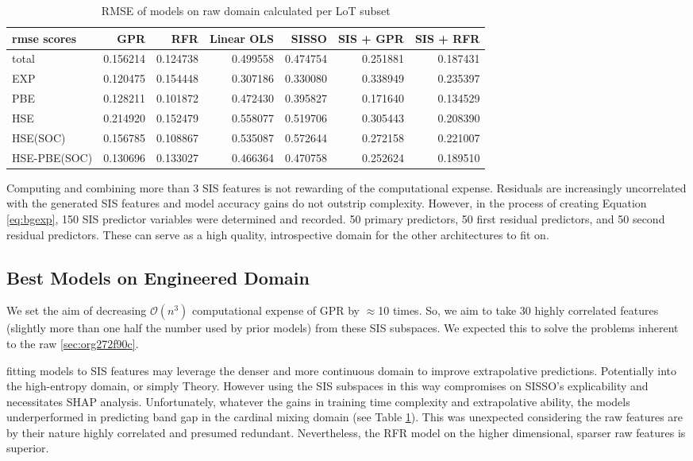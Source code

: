 \begin{table}[htbp]
\caption{\label{tbl:LoTscores} RMSE of models on raw domain calculated per LoT subset}
\centering
\begin{tabular}{lrrrrrr}
rmse scores & GPR & RFR & Linear OLS & SISSO & SIS + GPR & SIS + RFR\\[0pt]
\hline
total & 0.156214 & 0.124738 & 0.499558 & 0.474754 & 0.251881 & 0.187431\\[0pt]
EXP & 0.120475 & 0.154448 & 0.307186 & 0.330080 & 0.338949 & 0.235397\\[0pt]
PBE & 0.128211 & 0.101872 & 0.472430 & 0.395827 & 0.171640 & 0.134529\\[0pt]
HSE & 0.214920 & 0.152479 & 0.558077 & 0.519706 & 0.305443 & 0.208390\\[0pt]
HSE(SOC) & 0.156785 & 0.108867 & 0.535087 & 0.572644 & 0.272158 & 0.221007\\[0pt]
HSE-PBE(SOC) & 0.130696 & 0.133027 & 0.466364 & 0.470758 & 0.252624 & 0.189510\\[0pt]
\end{tabular}
\end{table}

Computing and combining more than 3 SIS features is not rewarding of the computational expense.
Residuals are increasingly uncorrelated with the generated SIS features and model accuracy gains do not outstrip complexity.
However, in the process of creating Equation \ref{eq:bgexp}, 150 SIS predictor variables were determined and recorded.
50 primary predictors, 50 first residual predictors, and 50 second residual predictors.
These can serve as a high quality, introspective domain for the other architectures to fit on.

\subsection{Best Models on Engineered Domain}
\label{sec:orga1a3a08}
We set the aim of decreasing \(\mathcal{O}(n^3)\) computational expense of GPR by \(\approx\)10 times.
So, we aim to take 30 highly correlated features (slightly more than one half the number used by prior models) from these SIS subspaces.
We expected this to solve the problems inherent to the raw \ref{sec:org272f90c}.

fitting models to SIS features may leverage the denser and more continuous domain to improve extrapolative predictions.
Potentially into the high-entropy domain, or simply Theory.
However using the SIS subspaces in this way compromises on SISSO's explicability and necessitates SHAP analysis.
Unfortunately, whatever the gains in training time complexity and extrapolative ability, the models underperformed in predicting band gap in the cardinal mixing domain (see Table \ref{tbl:LoTscores}).
This was unexpected considering the raw features are by their nature highly correlated and presumed redundant.
Nevertheless, the RFR model on the higher dimensional, sparser raw features is superior.

